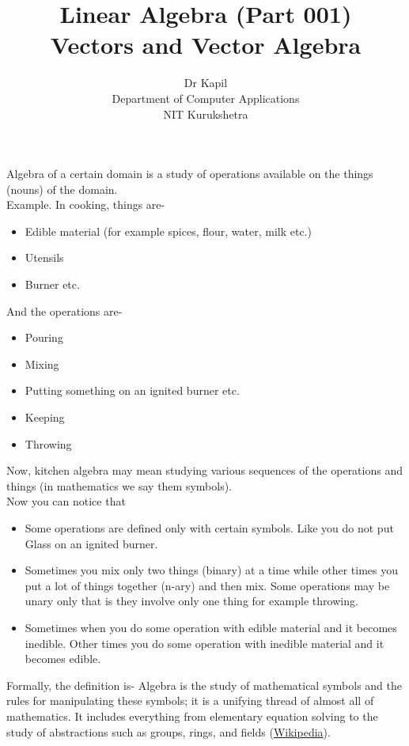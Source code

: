 \documentclass{article}
\title{Linear Algebra (Part 001)\\ Vectors and Vector Algebra}
\author{Dr Kapil \\Department of Computer Applications\\ NIT Kurukshetra}
\begin{document}
    \maketitle
   Algebra of a certain domain is a study of operations available on the things (nouns) of the domain.\\
Example. In cooking, things are-
\begin{itemize}
    \item Edible material (for example spices, flour, water, milk etc.)
    \item Utensils
    \item Burner etc.
\end{itemize}

And the operations are-
\begin{itemize}
    \item Pouring
    \item Mixing
    \item Putting something on an ignited burner etc.
    \item Keeping
    \item Throwing
\end{itemize}
Now, kitchen algebra may mean studying various sequences of the operations and things (in mathematics we say them symbols).\\
Now you can notice that
\begin{itemize}
    \item Some operations are defined only with certain symbols. Like you do not put Glass on an ignited burner.
    \item Sometimes you mix only two things (binary) at a time while other times you put a lot of things together (n-ary) and then mix. Some operations may be unary only that is they involve only one thing for example throwing.
    \item Sometimes when you do some operation with edible material and it becomes inedible.
    Other times you do some operation with inedible material and it becomes edible.
\end{itemize}

Formally, the definition is-  Algebra is the study of mathematical symbols and the rules for manipulating these symbols; it is a unifying thread of almost all of mathematics. It includes everything from elementary equation solving to the study of abstractions such as groups, rings, and fields (\href{https://en.wikipedia.org/wiki/Algebra}{Wikipedia}).
\end{document}
